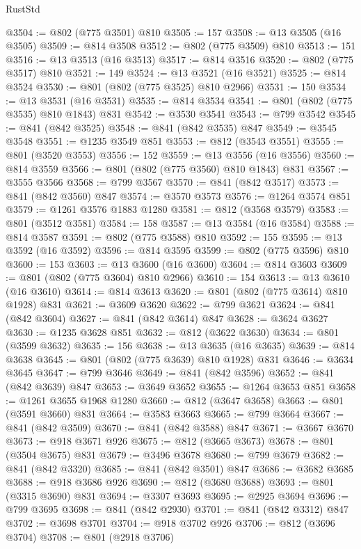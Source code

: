 \begin{lexlean}{RustStd}
\begin{coremodule}
{\begin{coremodule}
{{{{{@3504 := @802 (@775 @3501) @810
@3505 := 157
@3508 := @13 @3505 (@16 @3505)
@3509 := @814 @3508
@3512 := @802 (@775 @3509) @810
@3513 := 151
@3516 := @13 @3513 (@16 @3513)
@3517 := @814 @3516
@3520 := @802 (@775 @3517) @810
@3521 := 149
@3524 := @13 @3521 (@16 @3521)
@3525 := @814 @3524
@3530 := @801 (@802 (@775 @3525) @810 @2966)
@3531 := 150
@3534 := @13 @3531 (@16 @3531)
@3535 := @814 @3534
@3541 := @801 (@802 (@775 @3535) @810 @1843) @831
@3542 := @3530 @3541
@3543 := @799 @3542
@3545 := @841 (@842 @3525)
@3548 := @841 (@842 @3535) @847
@3549 := @3545 @3548
@3551 := @1235 @3549 @851
@3553 := @812 (@3543 @3551)
@3555 := @801 (@3520 @3553)
@3556 := 152
@3559 := @13 @3556 (@16 @3556)
@3560 := @814 @3559
@3566 := @801 (@802 (@775 @3560) @810 @1843) @831
@3567 := @3555 @3566
@3568 := @799 @3567
@3570 := @841 (@842 @3517)
@3573 := @841 (@842 @3560) @847
@3574 := @3570 @3573
@3576 := @1264 @3574 @851
@3579 := @1261 @3576 @1883 @1280
@3581 := @812 (@3568 @3579)
@3583 := @801 (@3512 @3581)
@3584 := 158
@3587 := @13 @3584 (@16 @3584)
@3588 := @814 @3587
@3591 := @802 (@775 @3588) @810
@3592 := 155
@3595 := @13 @3592 (@16 @3592)
@3596 := @814 @3595
@3599 := @802 (@775 @3596) @810
@3600 := 153
@3603 := @13 @3600 (@16 @3600)
@3604 := @814 @3603
@3609 := @801 (@802 (@775 @3604) @810 @2966)
@3610 := 154
@3613 := @13 @3610 (@16 @3610)
@3614 := @814 @3613
@3620 := @801 (@802 (@775 @3614) @810 @1928) @831
@3621 := @3609 @3620
@3622 := @799 @3621
@3624 := @841 (@842 @3604)
@3627 := @841 (@842 @3614) @847
@3628 := @3624 @3627
@3630 := @1235 @3628 @851
@3632 := @812 (@3622 @3630)
@3634 := @801 (@3599 @3632)
@3635 := 156
@3638 := @13 @3635 (@16 @3635)
@3639 := @814 @3638
@3645 := @801 (@802 (@775 @3639) @810 @1928) @831
@3646 := @3634 @3645
@3647 := @799 @3646
@3649 := @841 (@842 @3596)
@3652 := @841 (@842 @3639) @847
@3653 := @3649 @3652
@3655 := @1264 @3653 @851
@3658 := @1261 @3655 @1968 @1280
@3660 := @812 (@3647 @3658)
@3663 := @801 (@3591 @3660) @831
@3664 := @3583 @3663
@3665 := @799 @3664
@3667 := @841 (@842 @3509)
@3670 := @841 (@842 @3588) @847
@3671 := @3667 @3670
@3673 := @918 @3671 @926
@3675 := @812 (@3665 @3673)
@3678 := @801 (@3504 @3675) @831
@3679 := @3496 @3678
@3680 := @799 @3679
@3682 := @841 (@842 @3320)
@3685 := @841 (@842 @3501) @847
@3686 := @3682 @3685
@3688 := @918 @3686 @926
@3690 := @812 (@3680 @3688)
@3693 := @801 (@3315 @3690) @831
@3694 := @3307 @3693
@3695 := @2925 @3694
@3696 := @799 @3695
@3698 := @841 (@842 @2930)
@3701 := @841 (@842 @3312) @847
@3702 := @3698 @3701
@3704 := @918 @3702 @926
@3706 := @812 (@3696 @3704)
@3708 := @801 (@2918 @3706)
}}}}}
\end{coremodule}}
\end{coremodule}
\end{lexlean}
